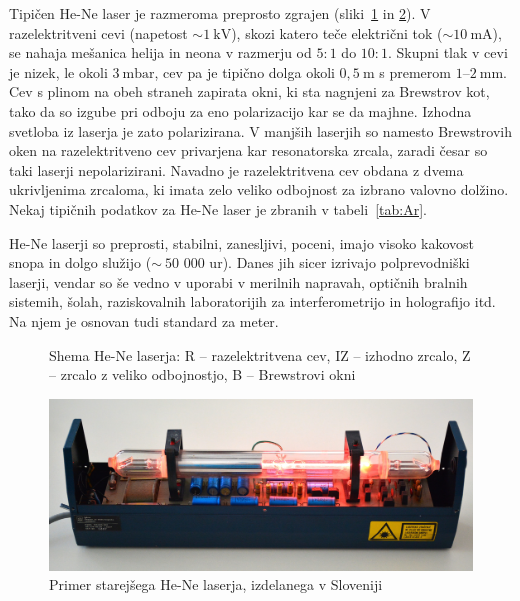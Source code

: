 Tipičen He-Ne laser je razmeroma preprosto zgrajen (sliki~\ref{fig:HeNeShema}
in \ref{fig:Iskra}).
V razelektritveni cevi (napetost  $\sim 1~\si{\kilo\volt}$), skozi
katero teče električni tok ($\sim 10~\si{\milli\ampere}$), 
se nahaja mešanica helija in neona v razmerju od
$5:1$ do $10:1$. Skupni tlak v cevi je nizek, le okoli $3~\si{\milli\bar}$, 
cev pa je tipično dolga okoli $0,5~\si{\metre}$ s premerom $1$--$2~\si{\milli\metre}$.  
Cev s plinom na obeh straneh zapirata okni, ki sta nagnjeni za Brewstrov kot, 
tako da so izgube pri odboju za eno polarizacijo kar se da majhne.
Izhodna svetloba iz laserja je zato polarizirana. V manjših laserjih
so namesto Brewstrovih oken na razelektritveno cev privarjena kar
resonatorska zrcala, zaradi česar so taki laserji nepolarizirani. 
Navadno je razelektritvena cev obdana z dvema ukrivljenima zrcaloma, 
ki imata zelo veliko odbojnost za izbrano valovno dolžino.
Nekaj tipičnih podatkov za He-Ne laser je zbranih v tabeli~\ref{tab:Ar}.

He-Ne laserji so preprosti, stabilni, zanesljivi, poceni, imajo visoko kakovost
snopa in dolgo služijo ($\sim~50\,\,000$ ur).
Danes jih sicer izrivajo polprevodniški laserji, vendar so še vedno v uporabi
v merilnih napravah, optičnih bralnih sistemih, šolah, raziskovalnih 
laboratorijih za interferometrijo in holografijo itd. Na njem je osnovan tudi 
standard za meter.
\newpage 

\begin{figure}[ht]
\centering
\def\svgwidth{90truemm} 

\caption{Shema He-Ne laserja: R -- razelektritvena cev, IZ -- izhodno zrcalo, Z -- zrcalo
z veliko odbojnostjo, B -- Brewstrovi okni}
\label{fig:HeNeShema}
\end{figure}
\begin{figure}[ht]
\centering
\includegraphics[width=128truemm]{slike/07_HeNe.jpg}
\caption{Primer starejšega He-Ne laserja, izdelanega v Sloveniji}
\label{fig:Iskra}
\end{figure}

